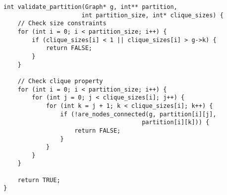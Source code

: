 \documentclass[12pt,a4paper]{article}
\begin{document}
\begin{lstlisting}[caption=Constraint Validation]
int validate_partition(Graph* g, int** partition, 
                      int partition_size, int* clique_sizes) {
    // Check size constraints
    for (int i = 0; i < partition_size; i++) {
        if (clique_sizes[i] < 1 || clique_sizes[i] > g->k) {
            return FALSE;
        }
    }
    
    // Check clique property
    for (int i = 0; i < partition_size; i++) {
        for (int j = 0; j < clique_sizes[i]; j++) {
            for (int k = j + 1; k < clique_sizes[i]; k++) {
                if (!are_nodes_connected(g, partition[i][j], 
                                       partition[i][k])) {
                    return FALSE;
                }
            }
        }
    }
    
    return TRUE;
}
\end{lstlisting}
\end{document}
